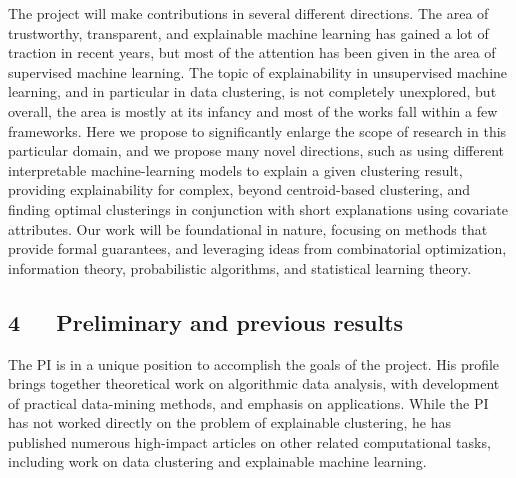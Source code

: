 \documentclass[a4paper,11pt]{article}
\begin{document}
The project will make contributions in several different directions. 
The area of trustworthy, transparent, and explainable machine learning 
has gained a lot of traction in recent years, but most of the attention
has been given in the area of supervised machine learning. 
The topic of explainability in unsupervised machine learning, 
and in particular in data clustering, 
is not completely unexplored, 
but overall, the area is mostly at its infancy and 
most of the works fall within a few frameworks. 
Here we propose to significantly enlarge the scope of research in this particular domain, 
and we propose many novel directions, 
such as using different interpretable machine-learning models to explain a given clustering result, 
providing explainability for complex, beyond centroid-based clustering, 
and finding optimal clusterings in conjunction with short explanations using covariate attributes. 
Our work will be foundational in nature, 
focusing on methods that provide formal guarantees, 
and leveraging ideas from combinatorial optimization, 
information theory, probabilistic algorithms, and statistical learning theory.

\subsection*{4~~~Preliminary and previous results}


The PI is in a unique position to accomplish the goals of the project. 
His profile brings together theoretical work on algorithmic data analysis, 
with development of practical data-mining methods, and emphasis on applications. 
While the PI has not worked directly on the problem of explainable clustering,
he has published numerous high-impact articles on other related computational tasks, 
including work on data clustering and explainable machine learning. 
\end{document}
